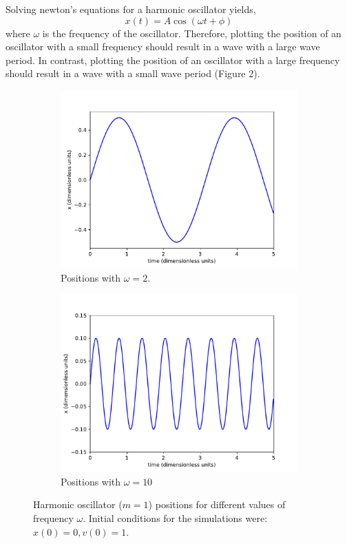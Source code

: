 \documentclass{article}
\newcommand{\be}{\begin{equation}}
\newcommand{\ee}{\end{equation}}
\begin{document}
Solving newton's equations for a harmonic oscillator yields,
\be
  x(t) = A \cos(\omega t + \phi)
\ee
where $\omega$ is the frequency of the oscillator.
Therefore, plotting the position of an oscillator with a small frequency should result in a wave with a large wave period.
In contrast, plotting the position of an oscillator with a large frequency should result in a wave with a small wave period (Figure 2).
\begin{figure}[H]
    \centering
    \begin{subfigure}[b]{0.49\textwidth}
        \includegraphics[width=\textwidth]{Figures/1dverlet/positw2.pdf}
  	\caption{Positions with $\omega = 2$.}
    \end{subfigure}
    \begin{subfigure}[b]{0.49\textwidth}
        \includegraphics[width=\textwidth]{Figures/1dverlet/positw10.pdf}
        \caption{Positions with $\omega = 10$}
    \end{subfigure}
    \caption{Harmonic oscillator ($m = 1$) positions for different values of frequency $\omega$. Initial conditions for the simulations were: $x(0) = 0, v(0) = 1$.}
\end{figure}
\end{document}
